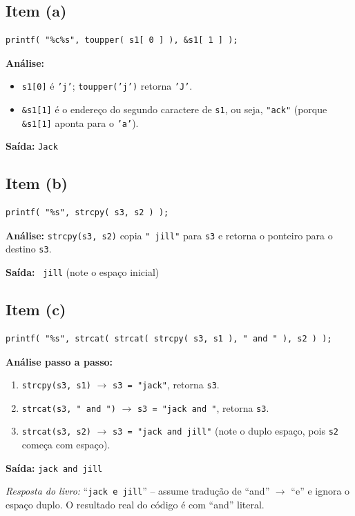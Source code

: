 \documentclass[12pt,a4paper]{article}
\begin{document}
\subsection*{Item (a)}
\begin{respostabox}
\begin{lstlisting}
printf( "%c%s", toupper( s1[ 0 ] ), &s1[ 1 ] );
\end{lstlisting}

\textbf{Análise:}
\begin{itemize}[noitemsep]
  \item \texttt{s1[0]} é \texttt{'j'}; \texttt{toupper('j')} retorna \texttt{'J'}.
  \item \texttt{\&s1[1]} é o endereço do segundo caractere de \texttt{s1}, ou seja,
  \texttt{"ack"} (porque \texttt{\&s1[1]} aponta para o \texttt{'a'}).
\end{itemize}
\textbf{Saída:} \texttt{Jack}
\end{respostabox}

\subsection*{Item (b)}
\begin{respostabox}
\begin{lstlisting}
printf( "%s", strcpy( s3, s2 ) );
\end{lstlisting}

\textbf{Análise:} \texttt{strcpy(s3, s2)} copia \texttt{" jill"} para \texttt{s3} e
retorna o ponteiro para o destino \texttt{s3}.

\textbf{Saída:} \texttt{ jill} (note o espaço inicial)
\end{respostabox}

\subsection*{Item (c)}
\begin{respostabox}
\begin{lstlisting}
printf( "%s", strcat( strcat( strcpy( s3, s1 ), " and " ), s2 ) );
\end{lstlisting}

\textbf{Análise passo a passo:}
\begin{enumerate}[noitemsep]
  \item \texttt{strcpy(s3, s1)} $\to$ \texttt{s3 = "jack"}, retorna \texttt{s3}.
  \item \texttt{strcat(s3, " and ")} $\to$ \texttt{s3 = "jack and "}, retorna \texttt{s3}.
  \item \texttt{strcat(s3, s2)} $\to$ \texttt{s3 = "jack and  jill"} (note o duplo
  espaço, pois \texttt{s2} começa com espaço).
\end{enumerate}

\textbf{Saída:} \texttt{jack and  jill}

\textit{Resposta do livro:} ``\texttt{jack e jill}'' -- assume tradução de
``and'' $\to$ ``e'' e ignora o espaço duplo. O resultado real do código é com
``and'' literal.
\end{respostabox}
\end{document}
